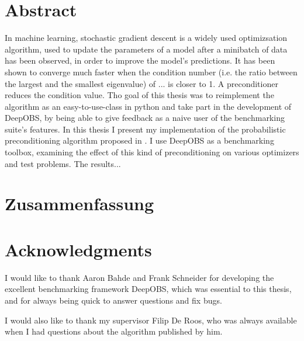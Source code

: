 \documentclass[twoside,12pt,a4paper]{report}
\begin{document}

\setcounter{page}{1}



\section*{Abstract}
In machine learning, stochastic gradient descent is a widely used optimizsation algorithm, used to update the parameters of a model after a minibatch of data has been observed, in order to improve the model's predictions. It has been shown to converge much faster when the condition number (i.e. the ratio between the largest and the smallest eigenvalue) of ... is closer to 1. A preconditioner reduces the condition value.
Tho goal of this thesis was to reimplement the algorithm as an easy-to-use-class in python and take part in the development of DeepOBS, by being able to give feedback as a naive user of the benchmarking suite's features.
In this thesis I present my implementation of the probabilistic preconditioning algorithm proposed in \cite{roos2019active}. I use DeepOBS \cite{deepobs} as a benchmarking toolbox, examining the effect of this kind of preconditioning on various optimizers and test problems. 
The results...

\newpage
\section*{Zusammenfassung}

\newpage
\section*{Acknowledgments}
I would like to thank Aaron Bahde and Frank Schneider for developing the excellent benchmarking framework DeepOBS, which was essential to this thesis, and for always being quick to answer questions and fix bugs.

I would also like to thank my supervisor Filip De Roos, who was always available when I had questions about the algorithm published by him.
\cleardoublepage
\end{document}
